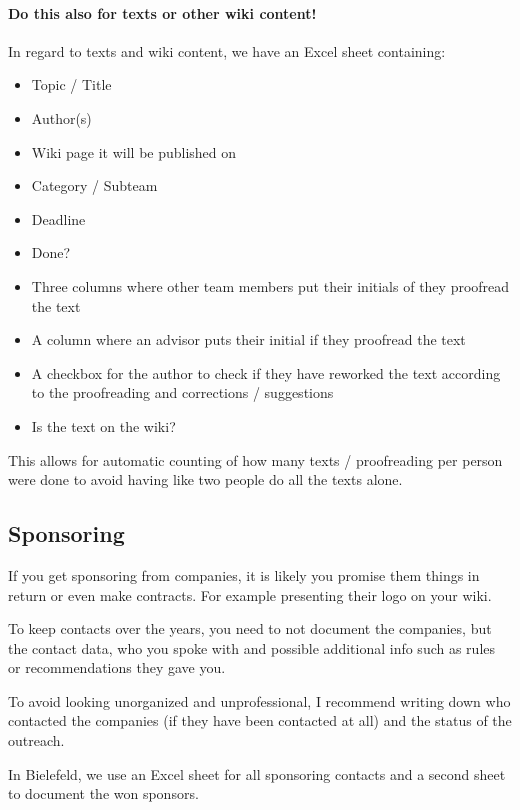 \paragraph{Do this also for texts or other wiki content!}
In regard to texts and wiki content, we have an Excel sheet containing:
\begin{itemize}
    \item Topic / Title
    \item Author(s)
    \item Wiki page it will be published on
    \item Category / Subteam
    \item Deadline
    \item Done?
    \item Three columns where other team members put their initials of they proofread the text
    \item A column where an advisor puts their initial if they proofread the text
    \item A checkbox for the author to check if they have reworked the text according to the proofreading and
    corrections / suggestions
    \item Is the text on the wiki?
\end{itemize}
This allows for automatic counting of how many texts / proofreading per person were done to avoid having like two
people do all the texts alone.

\subsection{Sponsoring}\label{subsec:sponsoring}
If you get sponsoring from companies, it is likely you promise them things in return or even make contracts.
For example presenting their logo on your wiki.

To keep contacts over the years, you need to not document the companies, but the contact data, who you spoke with
and possible additional info such as rules or recommendations they gave you.

To avoid looking unorganized and unprofessional, I recommend writing down who contacted the companies (if they have
been contacted at all) and the status of the outreach.

In Bielefeld, we use an Excel sheet for all sponsoring contacts and a second sheet to document the won sponsors.

